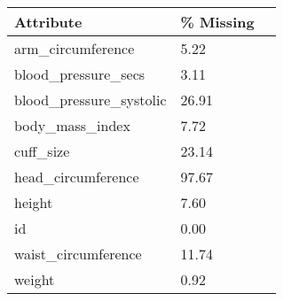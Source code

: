\begin{tabular}{llr}
\toprule
\textbf{Attribute} &  \textbf{\% Missing} \\
\midrule
arm\_circumference &       5.22 \\
blood\_pressure\_secs &       3.11 \\
blood\_pressure\_systolic &      26.91 \\
body\_mass\_index &       7.72 \\
cuff\_size &      23.14 \\
head\_circumference &      97.67 \\
height &       7.60 \\
id &       0.00 \\
waist\_circumference &      11.74 \\
weight &       0.92 \\
\bottomrule
\end{tabular}
